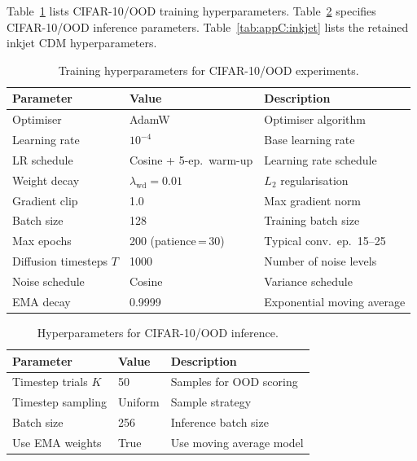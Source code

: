 Table~\ref{tab:appC:training} lists CIFAR-10/OOD training hyperparameters. Table~\ref{tab:appC:inference} specifies CIFAR-10/OOD inference parameters. Table~\ref{tab:appC:inkjet} lists the retained inkjet CDM hyperparameters.

\begin{table}[htbp]
  \centering
  \caption{Training hyperparameters for CIFAR-10/OOD experiments.}
  \label{tab:appC:training}
  \footnotesize
  \begin{tabular}{@{}llp{7.5cm}@{}}
    \toprule
    Parameter & Value & Description \\
    \midrule
    Optimiser & AdamW & Optimiser algorithm \\
    Learning rate & $10^{-4}$ & Base learning rate \\
    LR schedule & Cosine + 5-ep.\ warm-up & Learning rate schedule \\
    Weight decay & $\lambda_{\text{wd}} = 0.01$ & $L_2$ regularisation \\
    Gradient clip & 1.0 & Max gradient norm \\
    Batch size & 128 & Training batch size \\
    Max epochs & 200 (patience\,=\,30) & Typical conv.\ ep.\ 15--25 \\
    Diffusion timesteps $T$ & 1000 & Number of noise levels \\
    Noise schedule & Cosine & Variance schedule \\
    EMA decay & 0.9999 & Exponential moving average \\
    \bottomrule
  \end{tabular}
\end{table}

\begin{table}[htbp]
  \centering
  \caption{Hyperparameters for CIFAR-10/OOD inference.}
  \label{tab:appC:inference}
  \footnotesize
  \begin{tabular}{@{}llp{7.5cm}@{}}
    \toprule
    Parameter & Value & Description \\
    \midrule
    Timestep trials $K$ & 50 & Samples for OOD scoring \\
    Timestep sampling & Uniform & Sample strategy \\
    Batch size & 256 & Inference batch size \\
    Use EMA weights & True & Use moving average model \\
    \bottomrule
  \end{tabular}
\end{table}

